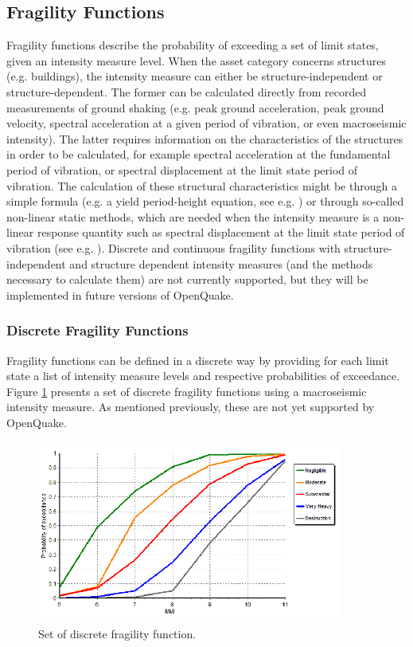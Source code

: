 \subsection{Fragility Functions}
Fragility functions describe the probability of exceeding a set of limit states, given an intensity measure level. When the asset category concerns structures (e.g. buildings), the intensity measure can either be structure-independent or structure-dependent. The former can be calculated directly from recorded measurements of ground shaking (e.g. peak ground acceleration, peak ground velocity, spectral acceleration at a given period of vibration, or even macroseismic intensity). The latter requires information on the characteristics of the structures in order to be calculated, for example spectral acceleration at the fundamental period of vibration, or spectral displacement at the limit state period of vibration. The calculation of these structural characteristics might be through a simple formula (e.g. a yield period-height equation, see e.g. \citet{CrowleyPinho2004} ) or through so-called non-linear static methods, which are needed when the intensity measure is a non-linear response quantity such as spectral displacement at the limit state period of vibration (see e.g. \citet{FEMA440ATC2005}).
Discrete and continuous fragility functions with structure-independent and structure dependent intensity measures (and the methods necessary to calculate them) are not currently supported, but they will be implemented in future versions of OpenQuake. 

\subsubsection{Discrete Fragility Functions}
Fragility functions can be defined in a discrete way by providing for each limit state a list of intensity measure levels and respective probabilities of exceedance. Figure \ref{fig:FFDiscrete} presents a set of discrete fragility functions using a macroseismic intensity measure. As mentioned previously, these are not yet supported by OpenQuake.

\begin{figure}[ht]
\centering
\includegraphics[width=10cm,height=6cm]{./Figures/Part_Risk/FFDiscrete.eps}
\caption{Set of discrete fragility function.}
\label{fig:FFDiscrete}
\end{figure}


